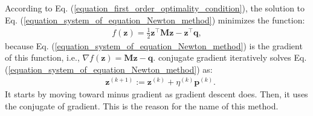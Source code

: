 \documentclass[lang=cn,10pt]{gorgeousnbook}
\numberwithin{equation}{section}%
\numberwithin{figure}{section}%
\begin{document}
According to Eq. (\ref{equation_first_order_optimality_condition}), the solution to Eq. (\ref{equation_system_of_equation_Newton_method}) minimizes the function:
\begin{align*}
f(\boldsymbol{z}) = \frac{1}{2} \boldsymbol{z}^\top \boldsymbol{M} \boldsymbol{z} - \boldsymbol{z}^\top \boldsymbol{q},
\end{align*}
because Eq. (\ref{equation_system_of_equation_Newton_method}) is the gradient of this function, i.e., $\nabla f(\boldsymbol{z}) = \boldsymbol{Mz} - \boldsymbol{q}$.
conjugate gradient iteratively solves Eq. (\ref{equation_system_of_equation_Newton_method}) as:
\begin{align}\label{equation_conjugate_gradient_update}
& \boldsymbol{z}^{(k+1)} := \boldsymbol{z}^{(k)} + \eta^{(k)} \boldsymbol{p}^{(k)}.
\end{align}
It starts by moving toward minus gradient as gradient descent does. Then, it uses the conjugate of gradient. This is the reason for the name of this method. 
\end{document}
